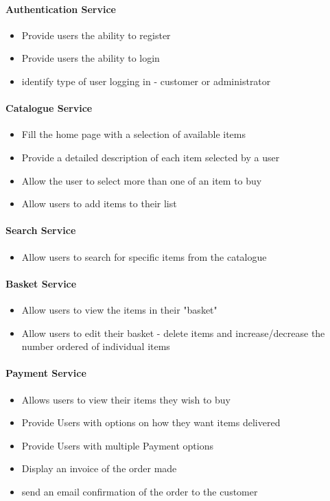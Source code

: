 	\paragraph{Authentication Service}
		\begin{itemize}
			\item Provide users the ability to register
			\item Provide users the ability to login
			\item identify type of user logging in - customer or administrator
		\end{itemize}
	\paragraph{Catalogue Service}
		\begin{itemize}
			\item Fill the home page with a selection of available items
			\item Provide a detailed description of each item selected by a user
			\item Allow the user to select more than one of an item to buy
			\item Allow users to add items to their list
		\end{itemize}
	\paragraph{Search Service}
		\begin{itemize}
			\item Allow users to search for specific items from the catalogue
		\end{itemize}
	\paragraph{Basket Service}
		\begin{itemize}
			\item Allow users to view the items in their "basket"
			\item Allow users to edit their basket - delete items and increase/decrease the number ordered of individual items
		\end{itemize}
	\paragraph{Payment Service}
		\begin{itemize}
			\item Allows users to view their items they wish to buy
			\item Provide Users with options on how they want items delivered
			\item Provide Users with multiple Payment options
			\item Display an invoice of the order made
			\item send an email confirmation of the order to the customer
		\end{itemize}
